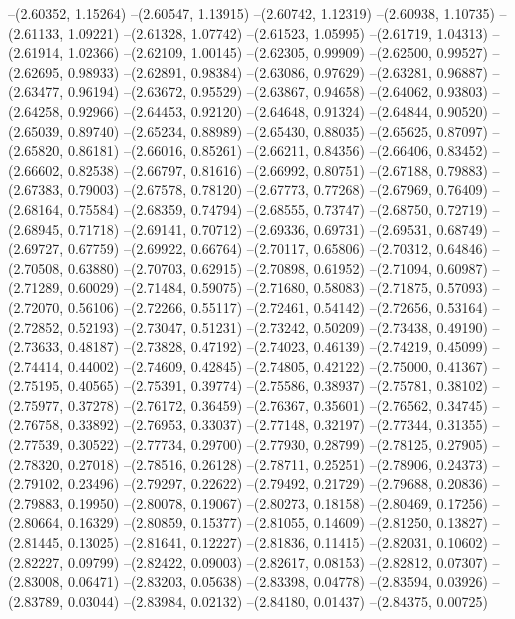 --(2.60352, 1.15264)
--(2.60547, 1.13915)
--(2.60742, 1.12319)
--(2.60938, 1.10735)
--(2.61133, 1.09221)
--(2.61328, 1.07742)
--(2.61523, 1.05995)
--(2.61719, 1.04313)
--(2.61914, 1.02366)
--(2.62109, 1.00145)
--(2.62305, 0.99909)
--(2.62500, 0.99527)
--(2.62695, 0.98933)
--(2.62891, 0.98384)
--(2.63086, 0.97629)
--(2.63281, 0.96887)
--(2.63477, 0.96194)
--(2.63672, 0.95529)
--(2.63867, 0.94658)
--(2.64062, 0.93803)
--(2.64258, 0.92966)
--(2.64453, 0.92120)
--(2.64648, 0.91324)
--(2.64844, 0.90520)
--(2.65039, 0.89740)
--(2.65234, 0.88989)
--(2.65430, 0.88035)
--(2.65625, 0.87097)
--(2.65820, 0.86181)
--(2.66016, 0.85261)
--(2.66211, 0.84356)
--(2.66406, 0.83452)
--(2.66602, 0.82538)
--(2.66797, 0.81616)
--(2.66992, 0.80751)
--(2.67188, 0.79883)
--(2.67383, 0.79003)
--(2.67578, 0.78120)
--(2.67773, 0.77268)
--(2.67969, 0.76409)
--(2.68164, 0.75584)
--(2.68359, 0.74794)
--(2.68555, 0.73747)
--(2.68750, 0.72719)
--(2.68945, 0.71718)
--(2.69141, 0.70712)
--(2.69336, 0.69731)
--(2.69531, 0.68749)
--(2.69727, 0.67759)
--(2.69922, 0.66764)
--(2.70117, 0.65806)
--(2.70312, 0.64846)
--(2.70508, 0.63880)
--(2.70703, 0.62915)
--(2.70898, 0.61952)
--(2.71094, 0.60987)
--(2.71289, 0.60029)
--(2.71484, 0.59075)
--(2.71680, 0.58083)
--(2.71875, 0.57093)
--(2.72070, 0.56106)
--(2.72266, 0.55117)
--(2.72461, 0.54142)
--(2.72656, 0.53164)
--(2.72852, 0.52193)
--(2.73047, 0.51231)
--(2.73242, 0.50209)
--(2.73438, 0.49190)
--(2.73633, 0.48187)
--(2.73828, 0.47192)
--(2.74023, 0.46139)
--(2.74219, 0.45099)
--(2.74414, 0.44002)
--(2.74609, 0.42845)
--(2.74805, 0.42122)
--(2.75000, 0.41367)
--(2.75195, 0.40565)
--(2.75391, 0.39774)
--(2.75586, 0.38937)
--(2.75781, 0.38102)
--(2.75977, 0.37278)
--(2.76172, 0.36459)
--(2.76367, 0.35601)
--(2.76562, 0.34745)
--(2.76758, 0.33892)
--(2.76953, 0.33037)
--(2.77148, 0.32197)
--(2.77344, 0.31355)
--(2.77539, 0.30522)
--(2.77734, 0.29700)
--(2.77930, 0.28799)
--(2.78125, 0.27905)
--(2.78320, 0.27018)
--(2.78516, 0.26128)
--(2.78711, 0.25251)
--(2.78906, 0.24373)
--(2.79102, 0.23496)
--(2.79297, 0.22622)
--(2.79492, 0.21729)
--(2.79688, 0.20836)
--(2.79883, 0.19950)
--(2.80078, 0.19067)
--(2.80273, 0.18158)
--(2.80469, 0.17256)
--(2.80664, 0.16329)
--(2.80859, 0.15377)
--(2.81055, 0.14609)
--(2.81250, 0.13827)
--(2.81445, 0.13025)
--(2.81641, 0.12227)
--(2.81836, 0.11415)
--(2.82031, 0.10602)
--(2.82227, 0.09799)
--(2.82422, 0.09003)
--(2.82617, 0.08153)
--(2.82812, 0.07307)
--(2.83008, 0.06471)
--(2.83203, 0.05638)
--(2.83398, 0.04778)
--(2.83594, 0.03926)
--(2.83789, 0.03044)
--(2.83984, 0.02132)
--(2.84180, 0.01437)
--(2.84375, 0.00725)

